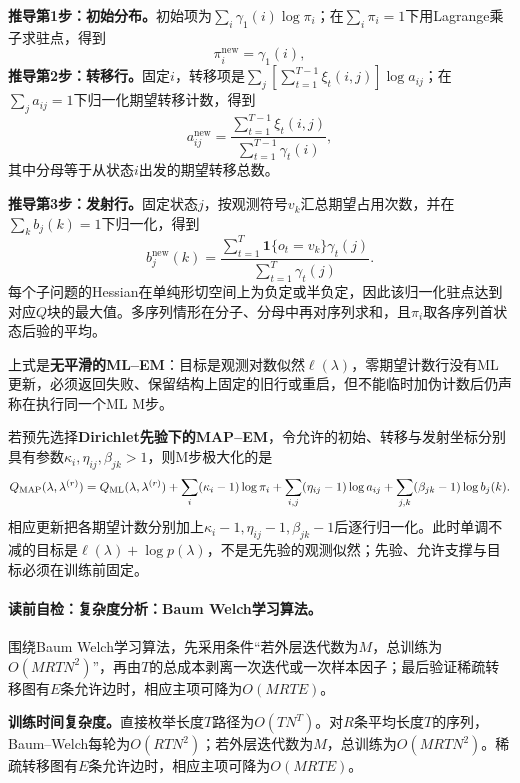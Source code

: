 \textbf{推导第1步：初始分布。}初始项为$\sum_i\gamma_1(i)\log\pi_i$；在$\sum_i\pi_i=1$下用Lagrange乘子求驻点，得到
\[
\pi_i^{\mathrm{new}}=\gamma_1(i),
\]
\textbf{推导第2步：转移行。}固定$i$，转移项是$\sum_j[\sum_{t=1}^{T-1}\xi_t(i,j)]\log a_{ij}$；在$\sum_ja_{ij}=1$下归一化期望转移计数，得到
\[
a_{ij}^{\mathrm{new}}=
\frac{\sum_{t=1}^{T-1}\xi_t(i,j)}
{\sum_{t=1}^{T-1}\gamma_t(i)},
\]
其中分母等于从状态$i$出发的期望转移总数。\par
\textbf{推导第3步：发射行。}固定状态$j$，按观测符号$v_k$汇总期望占用次数，并在$\sum_kb_j(k)=1$下归一化，得到
\[
b_j^{\mathrm{new}}(k)=
\frac{\sum_{t=1}^{T}\mathbf1\{o_t=v_k\}\gamma_t(j)}
{\sum_{t=1}^{T}\gamma_t(j)}.
\]
每个子问题的Hessian在单纯形切空间上为负定或半负定，因此该归一化驻点达到对应$Q$块的最大值。多序列情形在分子、分母中再对序列求和，且$\pi_i$取各序列首状态后验的平均。

上式是\textbf{无平滑的ML--EM}：目标是观测对数似然$\ell(\lambda)$，零期望计数行没有ML更新，必须返回失败、保留结构上固定的旧行或重启，但不能临时加伪计数后仍声称在执行同一个ML M步。

若预先选择\textbf{Dirichlet先验下的MAP--EM}，令允许的初始、转移与发射坐标分别具有参数$\kappa_i,\eta_{ij},\beta_{jk}>1$，则M步极大化的是
\[
Q_{\rm MAP}(\lambda,\lambda^{(r)})
=Q_{\rm ML}(\lambda,\lambda^{(r)})
+\sum_i(\kappa_i-1)\log\pi_i
+\sum_{i,j}(\eta_{ij}-1)\log a_{ij}
+\sum_{j,k}(\beta_{jk}-1)\log b_j(k).
\]
相应更新把各期望计数分别加上$\kappa_i-1,\eta_{ij}-1,\beta_{jk}-1$后逐行归一化。此时单调不减的目标是$\ell(\lambda)+\log p(\lambda)$，不是无先验的观测似然；先验、允许支撑与目标必须在训练前固定。
\endgroup

\label{struct:V3-C05-CH26}
\label{struct:V3-C05-CH27}
\paragraph{读前自检：复杂度分析：Baum Welch学习算法。}围绕Baum Welch学习算法，先采用条件“若外层迭代数为$M$，总训练为$O(MRTN^2)$”，再由$T$的总成本剥离一次迭代或一次样本因子；最后验证稀疏转移图有$E$条允许边时，相应主项可降为$O(MRTE)$。\par

\begin{complexitybox}
\textbf{训练时间复杂度。}直接枚举长度$T$路径为$O(TN^T)$。对$R$条平均长度$T$的序列，Baum--Welch每轮为$O(RTN^2)$；若外层迭代数为$M$，总训练为$O(MRTN^2)$。稀疏转移图有$E$条允许边时，相应主项可降为$O(MRTE)$。
\end{complexitybox}

